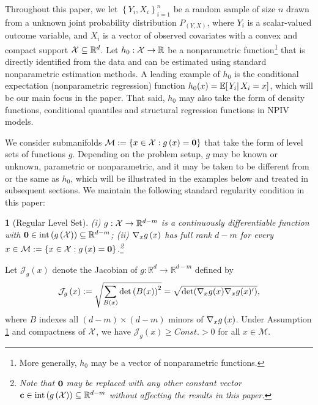 \documentclass[12pt,american]{article}
\theoremstyle{definition}
\theoremstyle{plain}
\newtheorem{assumption}{\protect\assumptionname}
\theoremstyle{definition}
\theoremstyle{plain}
\theoremstyle{plain}
\theoremstyle{plain}
\theoremstyle{plain}
\theoremstyle{plain}
\newcommand{\R}{\mathbb{R}}
\newcommand{\E}{\mathbb{E}}
\providecommand{\assumptionname}{Assumption}
\providecommand{\assumptionname}{Assumption}
\begin{document}
Throughout this paper, we let $\left\{Y_{i},X_{i}\right\}_{i=1}^{n}$ be a random sample of size $n$ drawn from a unknown joint probability distribution $P_{\left(Y,X\right)}$, where $Y_{i}$ is
a scalar-valued outcome variable, and $X_{i}$ is a vector of observed
covariates with a convex and compact support ${\cal X}\subseteq\R^{d}$. Let $h_{0}:{\cal X} \to \R$
be a nonparametric function\footnote{More generally, $h_0$ may be a vector of nonparametric functions.} that is directly identified
from the data and can be estimated using standard nonparametric estimation methods. A leading example of $h_0$ is the conditional expectation (nonparametric regression) function $h_0(x) = \E[\rest{Y_i}X_i=x]$, which will be our main focus in the paper. That said, $h_{0}$ may also take the form of density functions, conditional quantiles and structural regression functions in NPIV models.

We consider submanifolds ${\cal M}:=\left\{ x\in{\cal X}:g\left(x\right)={\bf 0}\right\}$ that take the form of level sets of functions $g$. Depending on the problem setup, $g$ may be known or unknown, parametric or nonparametric, and it may be taken to be different from or the same as $h_0$, which will be illustrated in the examples below and treated in subsequent sections.
We maintain the following standard regularity condition in this paper:

\begin{assumption}[Regular Level Set]
  \label{assu:RegLevelSet} (i) $g:{\cal X}\to\R^{d-m}$ is a continuously differentiable
  function with ${\bf 0}\in\text{int}\left(g\left({\cal X}\right)\right)\subseteq\R^{d-m}$; (ii) $\nabla_{x}g\left(x\right)$ has full rank $d-m$ for every $x\in{\cal M}:=\left\{ x\in{\cal X}:g\left(x\right)={\bf 0}\right\}$.\footnote{Note that ${\bf 0}$ may be replaced with any other constant vector
  ${\bf c} \in\text{int}\left(g\left({\cal X}\right)\right)\subseteq\R^{d-m}$
without affecting the results in this paper.}
\end{assumption}

Let $\mathcal{J}_g\left(x\right)$
denote the Jacobian of $g:\R^{d}\to\R^{d-m}$ defined by
\[
  \mathcal{J}_g\left(x\right):=\sqrt{\sum_{B(x)}\text{det}\left(B(x)\right)^{2}}=\sqrt{\det(\nabla_x g(x)\nabla_x g(x)')},
\]
where $B$ indexes all $\left(d-m\right)\times\left(d-m\right)$ minors
of $\nabla_x g\left(x\right)$. Under Assumption \ref{assu:RegLevelSet} and compactness of ${\cal X}$, we have $\mathcal{J}_g\left(x\right)\geq Const.>0$ for all $x\in\mathcal{M}$.
\end{document}
